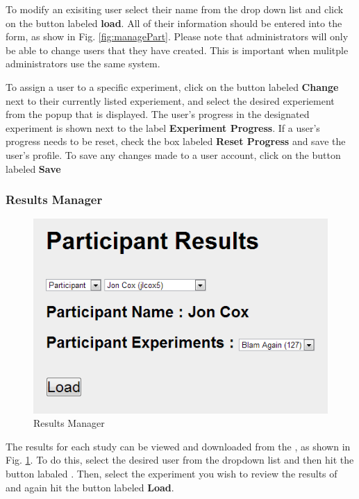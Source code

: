 \documentclass[article]{ij4uq}              %
\begin{document}
To modify an exisiting user select their name from the drop down list and click on the button labeled \textbf{load}.  All of their information should be entered into the form, as show in Fig. \ref{fig:managePart}.  Please note that administrators will only be able to change users that they have created.  This is important when mulitple administrators use the same system.

To assign a user to a specific experiment, click on the button labeled \textbf{Change} next to their currently listed experiement, and select the desired experiement from the popup that is displayed. The user's progress in the designated experiment is shown next to the label \textbf{Experiment Progress}.  If a user's progress needs to be reset, check the box labeled \textbf{Reset Progress} and save the user's profile.  To save any changes made to a user account, click on the button labeled \textbf{Save}


\subsubsection {Results Manager}

\begin{figure}[h!]
 \centering
 \includegraphics[width=5.0in]{figures/part_results.png}
 \caption{Results Manager}
 \label{fig:partResults}
\end{figure}
\FloatBarrier

The results for each study can be viewed and downloaded from the , as shown in Fig. \ref{fig:partResults}.  To do this, select the desired user from the dropdown list and then hit the button labaled .  Then, select the experiment you wish to review the results of and again hit the button labeled \textbf{Load}.
\end{document}
